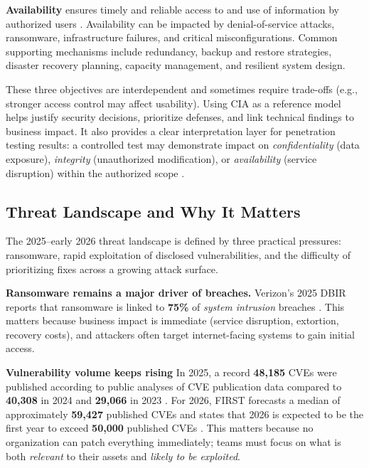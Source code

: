 \textbf{Availability} ensures timely and reliable access to and use of information by authorized users \cite{nistCIA}. Availability can be impacted by denial-of-service attacks, ransomware, infrastructure failures, and critical misconfigurations. Common supporting mechanisms include redundancy, backup and restore strategies, disaster recovery planning, capacity management, and resilient system design.

These three objectives are interdependent and sometimes require trade-offs (e.g., stronger access control may affect usability).
Using CIA as a reference model helps justify security decisions, prioritize defenses, and link technical findings to business impact.
It also provides a clear interpretation layer for penetration testing results: a controlled test may demonstrate impact on
\textit{confidentiality} (data exposure), \textit{integrity} (unauthorized modification), or \textit{availability} (service disruption)
within the authorized scope \cite{nistSP80012,iso27001}.



\subsection{Threat Landscape and Why It Matters}
\label{subsubsec:ch1-threats}

The 2025--early 2026 threat landscape is defined by three practical pressures: ransomware, rapid exploitation of disclosed vulnerabilities, and the difficulty of prioritizing fixes across a growing attack surface.

\textbf{Ransomware remains a major driver of breaches.}
Verizon’s 2025 DBIR reports that ransomware is linked to \textbf{75\%} of \emph{system intrusion} breaches \cite{verizonDBIR2025}.
This matters because business impact is immediate (service disruption, extortion, recovery costs), and attackers often target internet-facing systems to gain initial access.

\textbf{Vulnerability volume keeps rising}
In 2025, a record \textbf{48,185} CVEs were published according to public analyses of CVE publication data \cite{gamblinCVE2025Review,socketCVE2025} compared to \textbf{40,308} in 2024 and \textbf{29,066} in 2023 \cite{numbCVEsByYear} .
For 2026, FIRST forecasts a median of approximately \textbf{59,427} published CVEs and states that 2026 is expected to be the first year to exceed \textbf{50,000} published CVEs \cite{firstForecast2026}.
This matters because no organization can patch everything immediately; teams must focus on what is both \emph{relevant} to their assets and \emph{likely to be exploited}.

